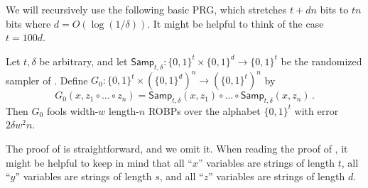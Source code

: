 \documentclass{toc}
\begin{document}
We will recursively use the following basic PRG, which stretches $t + dn$ bits to $tn$ bits where $d = O(\log(1/\delta))$. It might be helpful to think of the case $t = 100 d$.

\begin{lemma} \label{lem:samp-prg}
Let $t, \delta$ be arbitrary, and let $\mathsf{Samp}_{t, \delta} \colon \{0, 1\}^t \times \{0, 1\}^d \to \{0, 1\}^t$ be the randomized sampler of . Define $G_0 \colon \{0, 1\}^t \times (\{0, 1\}^d)^n \to (\{0, 1\}^t)^n$ by
$$
G_0(x, z_1 \circ \dots \circ z_n) = \mathsf{Samp}_{t, \delta}(x, z_1) \circ \dots \circ \mathsf{Samp}_{t, \delta}(x, z_n)\,.
$$
Then $G_0$ fools width-$w$ length-$n$ ROBPs over the alphabet $\{0, 1\}^t$ with error $2\delta w^2 n$.
\end{lemma}

The proof of  is straightforward, and we omit it. When reading the proof of , it might be helpful to keep in mind that all ``$x$'' variables are strings of length $t$, all ``$y$'' variables are strings of length $s$, and all ``$z$'' variables are strings of length $d$.
\end{document}
